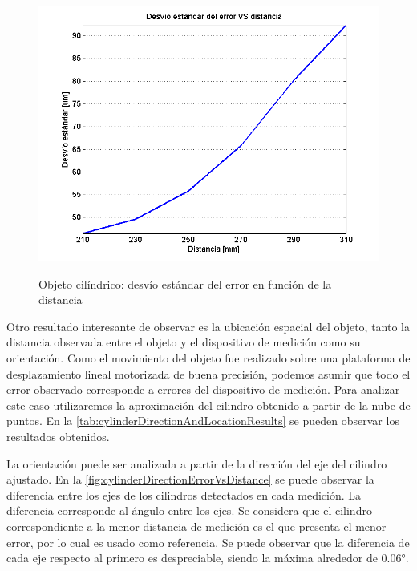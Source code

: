 \begin{figure}[!bth]
    \myfloatalign
        {\includegraphics[width=1.0\linewidth]{scans/plotCylinderSD}}
        \caption{Objeto cilíndrico: desvío estándar del error en función de la distancia}
        \label{fig:cylinderFitErrorVsDistance}
\end{figure}


Otro resultado interesante de observar es la ubicación espacial del objeto, tanto la distancia observada entre el objeto y el dispositivo de medición como su orientación. Como el movimiento del objeto fue realizado sobre una plataforma de desplazamiento lineal motorizada de buena precisión, podemos asumir que todo el error observado corresponde a errores del dispositivo de medición. Para analizar este caso utilizaremos la aproximación del cilindro obtenido a partir de la nube de puntos. En la \autoref{tab:cylinderDirectionAndLocationResults} se pueden observar los resultados obtenidos.  

La orientación puede ser analizada a partir de la dirección del eje del cilindro ajustado. En la \autoref{fig:cylinderDirectionErrorVsDistance} se puede observar la diferencia entre los ejes de los cilindros detectados en cada medición. La diferencia corresponde al ángulo entre los ejes. Se considera que el cilindro correspondiente a la menor distancia de medición es el que presenta el menor error, por lo cual es usado como referencia. Se puede observar que la diferencia de cada eje respecto al primero es despreciable, siendo la máxima alrededor de $0.06$°.

